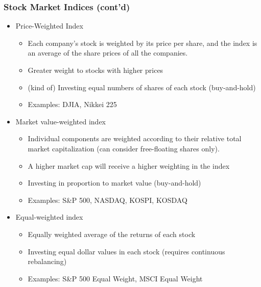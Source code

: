\documentclass[10pt]{beamer}
\begin{document}
	\begin{frame}
		\frametitle{Stock Market Indices (cont'd)}
		
		\begin{itemize}
			\item Price-Weighted Index	
			\begin{itemize}
				\item Each company's stock is weighted by its price per share, and the index is an average of the share prices of all the companies.
				\item Greater weight to stocks with higher prices
				\item (kind of) Investing equal numbers of shares	of each stock (buy-and-hold)
				\item Examples: DJIA, Nikkei 225
			\end{itemize}
			
			\item Market value-weighted index
			\begin{itemize}
				\item Individual components are weighted according to their relative total market capitalization (can consider free-floating shares only).
				\item A higher market cap will receive a higher weighting in the index
				\item Investing in proportion to market value (buy-and-hold)
				\item Examples: S\&P 500, NASDAQ, KOSPI, KOSDAQ
			\end{itemize}
			
			\item Equal-weighted index
			\begin{itemize}
				\item Equally weighted average of the returns of each stock
				\item Investing equal dollar values in each stock (requires continuous rebalancing)
				\item Examples: S\&P 500 Equal Weight, MSCI Equal Weight
			\end{itemize}
		\end{itemize}
		
	\end{frame}
	
	
	
	
	
\end{document}
